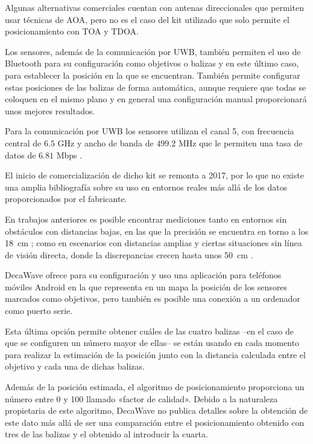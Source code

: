 Algunas alternativas comerciales cuentan con antenas direccionales que permiten usar técnicas de AOA, pero no es el caso del kit utilizado que solo permite el posicionamiento con TOA y TDOA.

Los sensores, además de la comunicación por UWB, también permiten el uso de Bluetooth para su configuración como objetivos o balizas y en este último caso, para establecer la posición en la que se encuentran.
También permite configurar estas posiciones de las balizas de forma automática, aunque requiere que todas se coloquen en el mismo plano y en general una configuración manual proporcionará unos mejores resultados.

Para la comunicación por UWB los sensores utilizan el canal 5, con frecuencia central de $6.5$ GHz y ancho de banda de $499.2$ MHz que le permiten una tasa de datos de $6.81$ Mbps \cite{Decawave}.

El inicio de comercialización de dicho kit se remonta a 2017, por lo que no existe una amplia bibliografía sobre su uso en entornos reales más allá de los datos proporcionados por el fabricante.

En trabajos anteriores es posible encontrar mediciones tanto en entornos sin obstáculos con distancias bajas, en las que la precisión se encuentra en torno a los 18~cm \cite{Simedroni}; como en escenarios con distancias amplias y ciertas situaciones sin línea de visión directa, donde la discrepancias crecen hasta unos 50~cm \cite{jimenez, kulmer}.

DecaWave ofrece para su configuración y uso una aplicación para teléfonos móviles Android en la que representa en un mapa la posición de los sensores marcados como objetivos, pero también es posible una conexión a un ordenador como puerto serie.

Esta última opción permite obtener cuáles de las cuatro balizas --en el caso de que se configuren un número mayor de ellas-- se están usando en cada momento para realizar la estimación de la posición junto con la distancia calculada entre el objetivo y cada una de dichas balizas.

Además de la posición estimada, el algoritmo de posicionamiento proporciona un número entre 0 y 100 llamado «factor de calidad».
Debido a la naturaleza propietaria de este algoritmo, DecaWave no publica detalles sobre la obtención de este dato más allá de ser una comparación entre el posicionamiento obtenido con tres de las balizas y el obtenido al introducir la cuarta.

